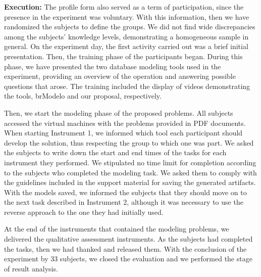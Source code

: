 \textbf{Execution:} 
The profile form also served as a term of participation, since the presence in the experiment was voluntary.
With this information, then we have randomized the subjects to define the groups.
We did not find wide discrepancies among the subjects' knowledge levels, demonstrating a homogeneous sample in general.
On the experiment day, the first activity carried out was a brief initial presentation.
Then, the training phase of the participants began.
During this phase, we have presented the two database modeling tools used in the experiment, providing an overview of the operation and answering possible questions that arose.
The training included the display of videos demonstrating the tools, brModelo and our proposal, respectively.

Then, we start the modeling phase of the proposed problems.
All subjects accessed the virtual machines with the problems provided in PDF documents.
When starting Instrument 1, we informed which tool each participant should develop the solution, thus respecting the group to which one was part.
We asked the subjects to write down the start and end times of the tasks for each instrument they performed.
We stipulated no time limit for completion according to the subjects who completed the modeling task. 
We asked them to comply with the guidelines included in the support material for saving the generated artifacts.
With the models saved, we informed the subjects that they should move on to the next task described in Instrument 2, although it was necessary to use the reverse approach to the one they had initially used.

At the end of the instruments that contained the modeling problems, we delivered the qualitative assessment instruments.
As the subjects had completed the tasks, then we had thanked and released them.
With the conclusion of the experiment by 33 subjects, we closed the evaluation and we performed the stage of result analysis.

